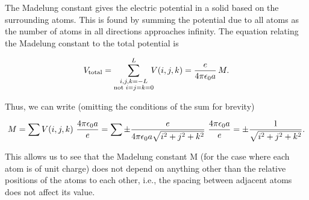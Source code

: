\documentclass[11pt]{article}
\begin{document}
The Madelung constant gives the electric potential in a solid based on
the surrounding atoms. This is found by summing the potential due to all
atoms as the number of atoms in all directions approaches infinity. The
equation relating the Madelung constant to the total potential is

\[V_\textrm{total} = \sum_{\substack{i,j,k=-L\\ \textrm{not }i=j=k=0}}^L
                   \hspace{-0.5em} V(i,j,k)
                 = {e\over4\pi\epsilon_0 a}\,M.\]

Thus, we can write (omitting the conditions of the sum for brevity)

\[M = \sum V(i,j,k) \ \frac{4\pi\epsilon_0 a}{e} = \sum \pm {e\over4\pi\epsilon_0 a\sqrt{i^2+j^2+k^2}} \ \frac{4\pi\epsilon_0 a}{e} = \pm\frac{1}{\sqrt{i^2+j^2+k^2}}.\]

This allows us to see that the Madelung constant M (for the case where
each atom is of unit charge) does not depend on anything other than the
relative positions of the atoms to each other, i.e., the spacing between
adjacent atoms does not affect its value.
\end{document}
